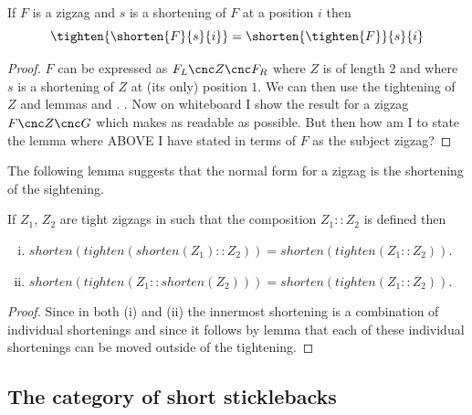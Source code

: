 {\begin{lemma}
If $F$ is a zigzag and $s$ is a shortening of $F$ at a position $i$ then
\[
\tighten{\shorten{F}{s}{i}} = \shorten{\tighten{F}}{s}{i}
\]
\end{lemma}
\begin{proof}
$F$ can be expressed as $F_L \cnc Z \cnc F_R$ where 
$Z$ is of length $2$ and where $s$ is a shortening of $Z$ at (its only)
position $1$. We can then use the tightening of $Z$ and lemmas
 and
.
. Now on whiteboard I show the result
for a zigzag $F \cnc Z \cnc G$ which makes as readable as possible.
But then how am I to state the lemma where ABOVE I have stated in terms of $F$ as the subject zigzag?
\end{proof}
\begin{aside}
The following lemma suggests that the normal form for a zigzag is the
shortening of the sightening.
\end{aside}
\begin{lemma}
If $Z_1$, $Z_2$ are tight zigzags in
 such that the composition $Z_1 :: Z_2$ is defined then
\begin{enumerate}[(i)]
\item 
$shorten(tighten(shorten(Z_1) :: Z_2))= shorten(tighten(Z_1 :: Z_2)).$
\item
$shorten(tighten(Z_1 :: shorten(Z_2)))= shorten(tighten(Z_1 :: Z_2)).$
\end{enumerate}
\end{lemma}
\begin{proof}
Since in both (i) and (ii) the innermost shortening is a combination 
of individual shortenings and since
it follows by lemma  that 
each of these individual shortenings can be moved outside of the tightening.
\end{proof}

\subsection{The category of short sticklebacks}

}
